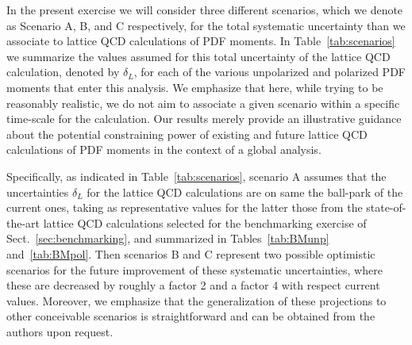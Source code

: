 In the present exercise we will consider three
different scenarios, which we denote
as Scenario A, B, and C respectively, for the total systematic
uncertainty than we associate to lattice
QCD calculations of PDF moments.
%
In Table~\ref{tab:scenarios} we summarize the
values assumed for this total uncertainty
    of the lattice QCD calculation, denoted by $\delta_L$, for each
    of the various unpolarized and polarized PDF moments that enter
    this analysis.
    We emphasize that here, while trying to be reasonably
    realistic, we do not aim to associate a given scenario
    within a specific time-scale for the calculation.
    Our results  merely provide an illustrative guidance about the potential
    constraining power of existing and future lattice QCD calculations
    of PDF  moments in the context
    of a global analysis.
    
    Specifically, as indicated
    in Table~\ref{tab:scenarios}, scenario A assumes that the uncertainties $\delta_L$
    for the lattice QCD calculations
    are on same the ball-park of the current ones, taking as
    representative values for the latter  those from the
    state-of-the-art lattice QCD calculations
    selected for the benchmarking exercise of Sect.~\ref{sec:benchmarking},
    and summarized in Tables~\ref{tab:BMunp} and~\ref{tab:BMpol}.
    Then scenarios B and C represent two possible optimistic scenarios for the
    future improvement of these systematic uncertainties, where these are decreased
    by roughly a factor 2 and a factor 4 with respect current values.
    Moreover, we emphasize that the generalization of these projections to other conceivable scenarios
    is straightforward and can be obtained from the authors upon request.
 
